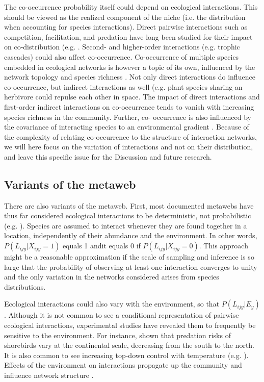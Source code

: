 \documentclass[12pt]{article}
\begin{document}
The co-occurrence probability itself could depend on ecological interactions.
This should be viewed as the realized component of the niche (i.e. the
distribution when accounting for species interactions). Direct pairwise
interactions such as competition, facilitation, and predation have long been
studied for their impact on co-distribution (e.g. \citealt{Diamond1976, Connor1980,
Gotelli2000}. Second- and higher-order interactions (e.g. trophic cascades)
could also affect co-occurrence. Co-occurrence of multiple species embedded in
ecological networks is however a topic of its own, influenced by the network
topology and species richness \citep{Cazelles2015}. Not only direct interactions do
influence co-occurrence, but indirect interactions as well (e.g. plant species
sharing an herbivore could repulse each other in space. The impact of direct
interactions and first-order indirect interactions on co-occurrence tends to
vanish with increasing species richness in the community. Further, co-
occurrence is also influenced by the covariance of interacting species to an
environmental gradient \citep{Cazelles2016}. Because of the complexity of relating
co-occurrence to the structure of interaction networks, we will here focus on
the variation of interactions and not on their distribution, and leave this
specific issue for the Discussion and future research.

\subsection*{Variants of the metaweb}

There are also variants of the metaweb. First, most documented metawebs have
thus far considered ecological interactions to be deterministic, not
probabilistic (e.g. \citealt{Havens1992, Woods2015}). Species are assumed to interact
whenever they are found together in a location, independently of their
abundance and the environment. In other words, $P(L_{ijy}|X_{ijy}=1)$ equals 1
andit equals 0 if $P(L_{ijy}|X_{ijy}=0)$. This approach might be a reasonable
approximation if the scale of sampling and inference is so large that the
probability of observing at least one interaction converges to unity and the
only variation in the networks considered arises from species distributions.

Ecological interactions could also vary with the environment, so that $P(L_{ijy}
|E_y)$. Although it is not common to see a conditional representation of
pairwise ecological interactions, experimental studies have revealed them to
frequently be sensitive to the environment. For instance, \citep{Mckinnon2010} shown
that predation risks of shorebirds vary at the continental scale, decreasing
from the south to the north. It is also common to see increasing top-down
control with temperature (e.g. \citealt{Shurin2012, Gray2016}). Effects of the
environment on interactions propagate up the community and influence network
structure \citep{Woodward2010; Petchey2010}.
\end{document}
